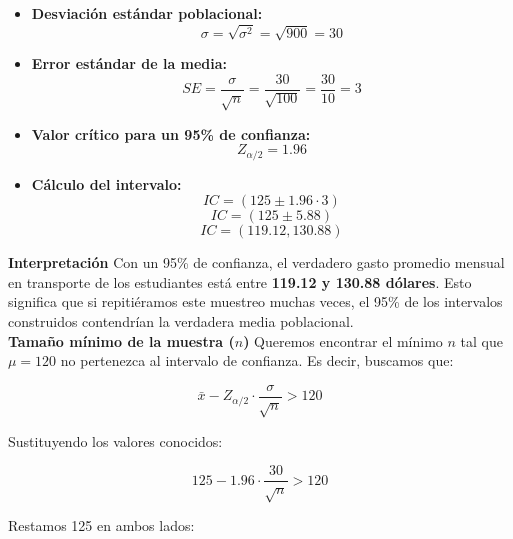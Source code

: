 \documentclass[10pt,a4paper]{article}
\begin{document}
\begin{itemize}
    \item \textbf{Desviación estándar poblacional:} 
    \begin{equation}
    \sigma = \sqrt{\sigma^2} = \sqrt{900} = 30
    \end{equation}
    \item \textbf{Error estándar de la media:}
    \begin{equation}
    SE = \frac{\sigma}{\sqrt{n}} = \frac{30}{\sqrt{100}} = \frac{30}{10} = 3
    \end{equation}
    \item \textbf{Valor crítico para un 95\% de confianza:}
    \begin{equation}
    Z_{\alpha/2} = 1.96
    \end{equation}
    \item \textbf{Cálculo del intervalo:}
    \begin{equation}
    IC = \left( 125 \pm 1.96 \cdot 3 \right)
    \end{equation}
    \begin{equation}
    IC = \left( 125 \pm 5.88 \right)
    \end{equation}
    \begin{equation}
    IC = (119.12, 130.88)
    \end{equation}
\end{itemize}

\textbf{Interpretación}
Con un 95\% de confianza, el verdadero gasto promedio mensual en transporte de los estudiantes está entre \textbf{119.12 y 130.88 dólares}. Esto significa que si repitiéramos este muestreo muchas veces, el 95\% de los intervalos construidos contendrían la verdadera media poblacional.\\

\textbf{Tamaño mínimo de la muestra ($n$)}
Queremos encontrar el mínimo $n$ tal que $\mu = 120$ no pertenezca al intervalo de confianza. Es decir, buscamos que:

\begin{equation}
\bar{x} - Z_{\alpha/2} \cdot \frac{\sigma}{\sqrt{n}} > 120
\end{equation}

Sustituyendo los valores conocidos:

\begin{equation}
125 - 1.96 \cdot \frac{30}{\sqrt{n}} > 120
\end{equation}

Restamos 125 en ambos lados:
\end{document}
